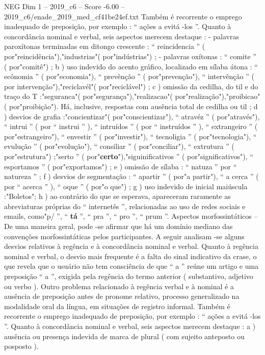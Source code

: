 \begin{textsample}{NEG Dim 1 – 2019\_c6 – Score -6.00 – 2019\_c6/enade\_2019\_med\_cf41be24ef.txt}
Também é recorrente o emprego inadequado de preposição, por exemplo : “ ações a evitá -los ”.
Quanto à concordância nominal e verbal, seis aspectos merecem destaque : - palavras paroxítonas terminadas em ditongo crescente : “ reincidencia ” ( por"reincidência"),"industrias"( por"indústrias") ; - palavras oxítonas : “ comite ” ( por"comitê") ; b ) uso indevido do acento gráfico, localizado em sílaba átona : “ ecônomia ” ( por"economia"), “ prevênção ” ( por"prevenção"), “ intervênção ” ( por intervenção"),"reciclavél"( por"reciclável") ; c ) omissão da cedilha, do til e do traço do T :"seguranca"( por"segurança"),"realizacao"( por"realização"),"proibicao"( por"proibição").
Há, inclusive, respostas com ausência total de cedilha ou til ; d ) desvios de grafia :"concientizar"( por"conscientizar"), “ atravéz ” ( por"através"), “ intrui ” ( por “ instrui ” ), “ intruídos ” ( por “ instruídos ” ), “ extrangeiro ” ( por"estrangeiro"), “ envestir ” ( por"investir"), “ tecnoligia ” ( por"tecnologia"), “ evulução ” ( por"evolução"), “ consiliar ” ( por"conciliar"), “ extrutura ” ( por"estrutura") ;"serto ” ( por"\textbf{certo}"),"siguinificativos ” ( por"significativos"), “ esportamos ” ( por"exportamos") ; e ) omissão de sílaba : “ natuza ” por “ natureza ” ; f ) desvios de segmentação : “ apartir ” ( por"a partir"), “ a cerca ” ( por “ acerca ” ), “ oque ” ( por"o que") ; g ) uso indevido de inicial maiúscula :"Boletos"; h ) ao contrário do que se esperava, apareceram raramente as abreviaturas próprias do “ internetês ”, relacionadas ao uso de redes sociais e emails, como"p/ ”, “ \textbf{tá} ”, “ pra ”, “ pro ”, “ prum ”.
Aspectos morfossintáticos – De uma maneira geral, pode -se afirmar que há um domínio mediano das convenções morfossintáticas pelos participantes.
A seguir analisam -se alguns desvios relativos à regência e à concordância nominal e verbal.
Quanto à regência nominal e verbal, o desvio mais frequente é a falta do sinal indicativo da crase, o que revela que o usuário não tem consciência de que “ a ” reúne um artigo e uma preposição “ a ”, exigida pela regência do termo anterior ( substantivo, adjetivo ou verbo ).
Outro problema relacionado à regência verbal e à nominal é a ausência de preposição antes de pronome relativo, processo generalizado na modalidade oral da língua, em situações de registro informal.
Também é recorrente o emprego inadequado de preposição, por exemplo : “ ações a evitá -los ”.
Quanto à concordância nominal e verbal, seis aspectos merecem destaque : a ) ausência ou presença indevida de marca de plural ( com sujeito anteposto ou posposto ).

\end{textsample}
